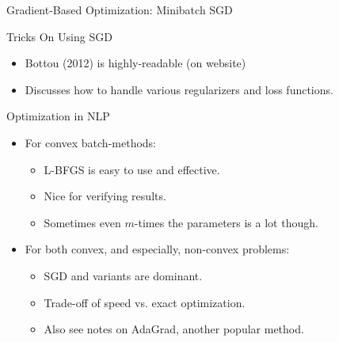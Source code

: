 \documentclass{beamer}
\begin{document}
\begin{frame}{Gradient-Based Optimization: Minibatch SGD}
  \begin{figure}
    \begin{algorithmic}
      \EndFor{}
      \EndWhile{}
      \State{\Return{$\theta$}}
    \end{algorithmic}
  \end{figure}
\end{frame}


\begin{frame}{Tricks On Using SGD}
  \begin{itemize}
  \item Bottou (2012) is highly-readable (on website)
  \item Discusses how to handle various regularizers and loss functions.
  \end{itemize}
\end{frame}

\begin{frame}{Optimization in NLP}
  \begin{itemize}
  \item For convex batch-methods:
    \begin{itemize}
    \item L-BFGS is easy to use and effective. 
    \item Nice for verifying results.
    \item Sometimes even $m$-times the parameters is a lot though.
    \end{itemize}
    
\air

  \item For both convex, and especially, non-convex problems:
    \begin{itemize}
    \item SGD and variants are dominant.
    \item Trade-off of speed vs. exact optimization.
    \item Also see notes on AdaGrad, another popular method.
    \end{itemize}
  \end{itemize}
\end{frame}
\end{document}
